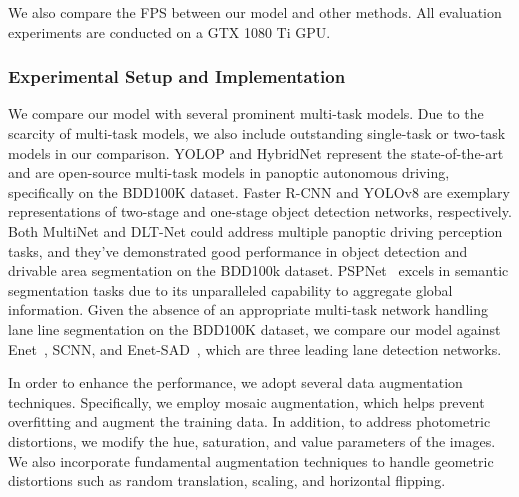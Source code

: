 \documentclass[lettersize,journal]{IEEEtran}
\begin{document}
We also compare the FPS between our model and other methods. All evaluation experiments are conducted on a GTX 1080 Ti GPU.

\subsubsection{Experimental Setup and Implementation}
\label{subsubsec: Experimental Setup and Implementation}
We compare our model with several prominent multi-task models. Due to the scarcity of multi-task models, we also include outstanding single-task or two-task models in our comparison. YOLOP and HybridNet represent the state-of-the-art and are open-source multi-task models in panoptic autonomous driving, specifically on the BDD100K dataset. Faster R-CNN and YOLOv8 are exemplary representations of two-stage and one-stage object detection networks, respectively. Both MultiNet and DLT-Net could address multiple panoptic driving perception tasks, and they've demonstrated good performance in object detection and drivable area segmentation on the BDD100k dataset. PSPNet~\cite{zhao2017pyramid} excels in semantic segmentation tasks due to its unparalleled capability to aggregate global information. Given the absence of an appropriate multi-task network handling lane line segmentation on the BDD100K dataset, we compare our model against Enet~\cite{cai2018cascade}, SCNN, and Enet-SAD~\cite{pang2019libra}, which are three leading lane detection networks. 

In order to enhance the performance, we adopt several data augmentation techniques. Specifically, we employ mosaic augmentation, which helps prevent overfitting and augment the training data. In addition, to address photometric distortions, we modify the hue, saturation, and value parameters of the images. We also incorporate fundamental augmentation techniques to handle geometric distortions such as random translation, scaling, and horizontal flipping. 
\end{document}
